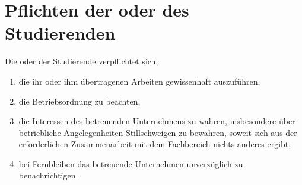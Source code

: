 \section{Pflichten der oder des Studierenden}

Die oder der Studierende verpflichtet sich,
\begin{enumerate}
\item die ihr oder ihm übertragenen Arbeiten gewissenhaft auszuführen,
\item die Betriebsordnung zu beachten,
\item die Interessen des betreuenden Unternehmens zu wahren, insbesondere über betriebliche Angelegenheiten Stillschweigen zu bewahren, soweit sich aus der erforderlichen Zusammenarbeit mit dem Fachbereich \departement{} nichts anderes ergibt,
\item bei Fernbleiben das betreuende Unternehmen unverzüglich zu benachrichtigen.
\end{enumerate}